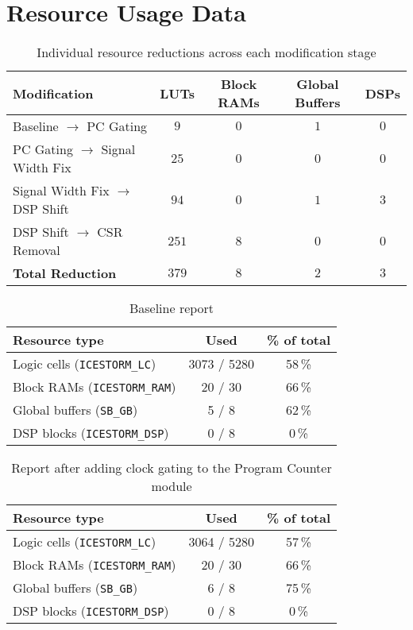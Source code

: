 \documentclass[a4paper,10pt]{article}
\begin{document}
\newpage
\appendix
\section{Resource Usage Data}

\begin{table}[H] 
    \centering
    \begin{tabularx}{0.85\textwidth}{X c c c c}
        \toprule
        Modification & LUTs & Block RAMs & Global Buffers & DSPs \\ \midrule
        Baseline $\rightarrow$ PC Gating & $9$ & $0$ & $1$ & $0$ \\
        PC Gating $\rightarrow$ Signal Width Fix & $25$ & $0$ & $0$ & $0$ \\
        Signal Width Fix $\rightarrow$ DSP Shift & $94$ & $0$ & $1$ & $3$ \\
        DSP Shift $\rightarrow$ CSR Removal & $251$ & $8$ & $0$ & $0$ \\ \midrule
        \textbf{Total Reduction} & \textbf{$379$} & \textbf{$8$} & \textbf{$2$} & \textbf{$3$} \\
        \bottomrule
    \end{tabularx}
    \caption{Individual resource reductions across each modification stage}
    \label{tab:modification_reductions}
\end{table}

\begin{table}[H] 
    \centering
    \begin{tabularx}{0.65\textwidth}{X c c}
        \toprule
        Resource type & Used & \% of total \\ \midrule
        Logic cells (\texttt{ICESTORM\_LC}) & 3073 / 5280 & 58\,\% \\
        Block RAMs (\texttt{ICESTORM\_RAM}) & 20 / 30 & 66\,\% \\
        Global buffers (\texttt{SB\_GB}) & 5 / 8 & 62\,\% \\
        DSP blocks (\texttt{ICESTORM\_DSP}) & 0 / 8 & 0\,\% \\
        \bottomrule
    \end{tabularx}
    \caption{Baseline report}
    \label{tab:baseline}
\end{table}

\begin{table}[H] 
    \centering
    \begin{tabularx}{0.65\textwidth}{X c c}
        \toprule
        Resource type & Used & \% of total \\ \midrule
        Logic cells (\texttt{ICESTORM\_LC}) & 3064 / 5280 & 57\,\% \\
        Block RAMs (\texttt{ICESTORM\_RAM}) & 20 / 30 & 66\,\% \\
        Global buffers (\texttt{SB\_GB}) & 6 / 8 & 75\,\% \\
        DSP blocks (\texttt{ICESTORM\_DSP}) & 0 / 8 & 0\,\% \\
        \bottomrule
    \end{tabularx}
    \caption{Report after adding clock gating to the Program Counter module}
    \label{tab:Program_Counter}
\end{table}
\end{document}

